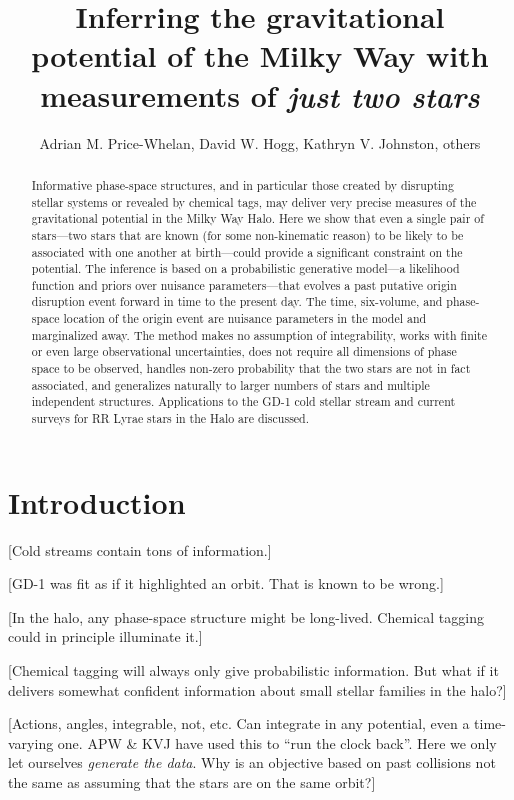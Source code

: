 \documentclass[letterpaper,12pt,preprint]{aastex}
\begin{document}
\title{Inferring the gravitational potential of the Milky Way with measurements of \emph{just two stars}}
\author{Adrian M. Price-Whelan, David W. Hogg, Kathryn V. Johnston, others}

\begin{abstract}
Informative phase-space structures, and in particular those created by
disrupting stellar systems or revealed by chemical tags, may deliver
very precise measures of the gravitational potential in the Milky Way
Halo.  Here we show that even a single pair of stars---two stars that
are known (for some non-kinematic reason) to be likely to be
associated with one another at birth---could provide a significant
constraint on the potential.  The inference is based on a
probabilistic generative model---a likelihood function and priors over
nuisance parameters---that evolves a past putative origin disruption
event forward in time to the present day.  The time, six-volume, and
phase-space location of the origin event are nuisance parameters in
the model and marginalized away.  The method makes no assumption of
integrability, works with finite or even large observational
uncertainties, does not require all dimensions of phase space to be
observed, handles non-zero probability that the two stars are not in
fact associated, and generalizes naturally to larger numbers of stars
and multiple independent structures.  Applications to the GD-1 cold
stellar stream and current surveys for RR Lyrae stars in the Halo are
discussed.
\end{abstract}


\section{Introduction}

[Cold streams contain tons of information.]

[GD-1 was fit as if it highlighted an orbit.  That is known to be
  wrong.]

[In the halo, any phase-space structure might be long-lived.  Chemical
  tagging could in principle illuminate it.]

[Chemical tagging will always only give probabilistic information.
  But what if it delivers somewhat confident information about small
  stellar families in the halo?]

[Actions, angles, integrable, not, etc.  Can integrate in any
  potential, even a time-varying one.  APW \& KVJ have used this to
  ``run the clock back''.  Here we only let ourselves \emph{generate
    the data}.  Why is an objective based on past collisions not the
  same as assuming that the stars are on the same orbit?]
\end{document}
